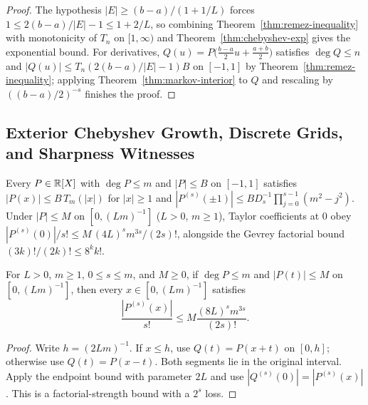 \begin{proof}
The hypothesis $|E| \ge (b-a)/(1+1/L)$ forces $1 \le 2(b-a)/|E| - 1 \le 1 + 2/L$, so combining Theorem~\ref{thm:remez-inequality} with monotonicity of $T_n$ on $[1, \infty)$ and Theorem~\ref{thm:chebyshev-exp} gives the exponential bound. For derivatives, $Q(u) = P\bigl(\frac{b-a}{2}u + \frac{a+b}{2}\bigr)$ satisfies $\deg Q \le n$ and $|Q(u)| \le T_n(2(b-a)/|E| - 1) B$ on $[-1, 1]$ by Theorem~\ref{thm:remez-inequality}; applying Theorem~\ref{thm:markov-interior} to $Q$ and rescaling by $((b-a)/2)^{-s}$ finishes the proof.
\end{proof}

\subsection{Exterior Chebyshev Growth, Discrete Grids, and Sharpness Witnesses}

\begin{theorem}
\label{thm:markov-general}
\leanok
Every $P \in \mathbb{R}[X]$ with $\deg P \le m$ and $|P| \le B$ on $[-1, 1]$ satisfies $|P(x)| \le B\,T_m(|x|)$ for $|x| \ge 1$ and $|P^{(s)}(\pm 1)| \le B D_s^{-1}\prod_{j=0}^{s-1}(m^2-j^2)$. Under $|P| \le M$ on $[0, (Lm)^{-1}]$ ($L > 0$, $m \ge 1$), Taylor coefficients at $0$ obey $|P^{(s)}(0)|/s! \le M\,(4L)^s m^{3s}/(2s)!$, alongside the Gevrey factorial bound $(3k)!/(2k)! \le 8^k k!$.
\end{theorem}

\begin{lemma}
\label{lem:reciprocal-interval-factorial}
\leanok
{}
For $L>0$, $m\ge1$, $0\le s\le m$, and $M\ge0$, if
$\deg P\le m$ and $|P(t)|\le M$ on $[0,(Lm)^{-1}]$, then every
$x\in[0,(Lm)^{-1}]$ satisfies
\[
\frac{|P^{(s)}(x)|}{s!}\le M\frac{(8L)^s m^{3s}}{(2s)!}.
\]
\end{lemma}
\begin{proof}
Write $h=(2Lm)^{-1}$. If $x\le h$, use $Q(t)=P(x+t)$ on $[0,h]$;
otherwise use $Q(t)=P(x-t)$. Both segments lie in the original interval.
Apply the endpoint bound with parameter $2L$ and use
$|Q^{(s)}(0)|=|P^{(s)}(x)|$. This is a factorial-strength bound with a
$2^s$ loss.
\end{proof}

